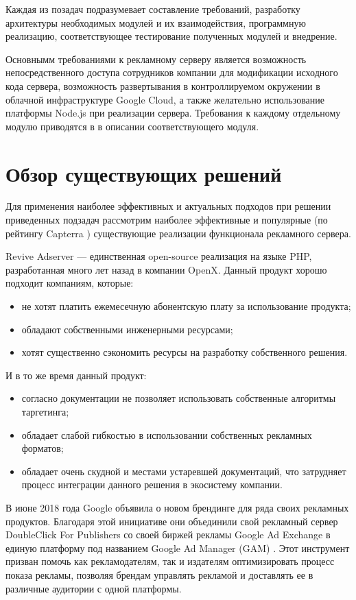 \documentclass[times]{itmo-student-thesis}
\begin{document}
Каждая из позадач подразумевает составление требований, разработку архитектуры необходимых модулей и их взаимодействия, программную реализацию, соответствующее тестирование полученных модулей и внедрение. 

Основнымм требованиями к рекламному серверу является возможность непосредственного доступа сотрудников компании для модификации исходного кода сервера, возможность развертывания в контроллируемом окружении в облачной инфраструктуре Google Cloud, а также желательно использование платформы Node.js при реализации сервера. Требования к каждому отдельному модулю приводятся в в описании соответствующего модуля.

\section{Обзор существующих решений}

Для применения наиболее эффективных и актуальных подходов при решении приведенных подзадач рассмотрим наиболее эффективные и популярные (по рейтингу Capterra \cite{capterra}) существующие реализации функционала рекламного сервера.


Revive Adserver \cite{revive-adserver} — единственная open-source реализация на языке PHP, разработанная много лет назад в компании OpenX. Данный продукт хорошо подходит компаниям, которые:
\begin{itemize}
\item не хотят платить ежемесечную абонентскую плату за использование продукта;
\item обладают собственными инженерными ресурсами;
\item хотят существенно сэкономить ресурсы на разработку собственного решения.
\end{itemize}
И в то же время данный продукт:
\begin{itemize}
\item согласно документации не позволяет использовать собственные алгоритмы таргетинга;
\item обладает слабой гибкостью в использовании собственных рекламных форматов;
\item обладает очень скудной и местами устаревшей документаций, что затрудняет процесс интеграции данного решения в экосистему компании.
\end{itemize}


В июне 2018 года Google объявила о новом брендинге для ряда своих рекламных продуктов. Благодаря этой инициативе они объединили свой рекламный сервер DoubleClick For Publishers со своей биржей рекламы Google Ad Exchange в единую платформу под названием Google Ad Manager (GAM) \cite{google-ad-manager}. Этот инструмент призван помочь как рекламодателям, так и издателям оптимизировать процесс показа рекламы, позволяя брендам управлять рекламой и доставлять ее в различные аудитории с одной платформы. 
\end{document}
